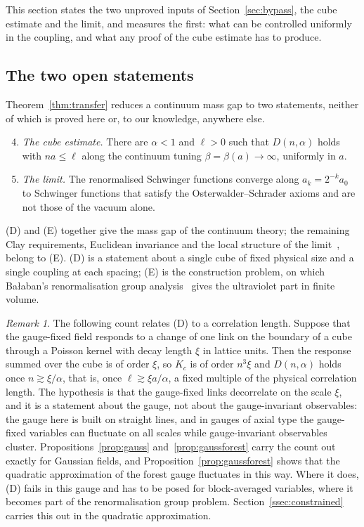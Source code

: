 \documentclass[11pt]{amsart}
\theoremstyle{definition}
\theoremstyle{remark}
\newtheorem{remark}[theorem]{Remark}
\numberwithin{equation}{section}
\begin{document}
This section states the two unproved inputs of Section~\ref{sec:bypass}, the cube
estimate and the limit, and measures the first: what can be controlled
uniformly in the coupling, and what any proof of the cube estimate has to
produce.

\subsection{The two open statements}

Theorem~\ref{thm:transfer} reduces a continuum mass gap to two statements,
neither of which is proved here or, to our knowledge, anywhere else.
\begin{enumerate}[label=\textup{(\Alph*)},leftmargin=*]
\setcounter{enumi}{3}
\item \emph{The cube estimate.} There are $\alpha<1$ and $\ell>0$ such that
$D(n,\alpha)$ holds with $na\le\ell$ along the continuum tuning
$\beta=\beta(a)\to\infty$, uniformly in $a$.
\item \emph{The limit.} The renormalised Schwinger functions converge along
$a_k=2^{-k}a_0$ to Schwinger functions that satisfy the
Osterwalder--Schrader axioms and are not those of the vacuum alone.
\end{enumerate}
(D) and (E) together give the mass gap of the continuum theory; the
remaining Clay requirements, Euclidean invariance and the local structure of
the limit~\cite{JW06}, belong to (E). (D) is a statement about a single
cube of fixed physical size and a single coupling at each spacing; (E) is the
construction problem, on which Ba{\l}aban's renormalisation group
analysis~\cite{Bal84a,Bal85a,Bal89b} gives the ultraviolet part in finite
volume.

\begin{remark}\label{rem:cubeheuristic}
The following count relates (D) to a correlation length. Suppose that the
gauge-fixed field responds to a change of one link on the boundary of a cube
through a Poisson kernel with decay length $\xi$ in lattice units. Then the
response summed over the cube is of order $\xi$, so $K_c$ is of order
$n^3\xi$ and $D(n,\alpha)$ holds once $n\gtrsim\xi/\alpha$, that is, once
$\ell\gtrsim\xi a/\alpha$, a fixed multiple of the physical correlation
length. The hypothesis is that the gauge-fixed links decorrelate on the
scale $\xi$, and it is a statement about the gauge, not about the
gauge-invariant observables: the gauge here is built on straight lines, and
in gauges of axial type the gauge-fixed variables can fluctuate on all
scales while gauge-invariant observables cluster. Propositions~\ref{prop:gauss}
and~\ref{prop:gaussforest} carry the count out exactly for Gaussian fields,
and Proposition~\ref{prop:gaussforest} shows that the quadratic
approximation of the forest gauge fluctuates in this way. Where it does,
(D) fails in this gauge and has to be posed for block-averaged variables,
where it becomes part of the renormalisation group problem.
Section~\ref{ssec:constrained} carries this out in the quadratic approximation.
\end{remark}
\end{document}
